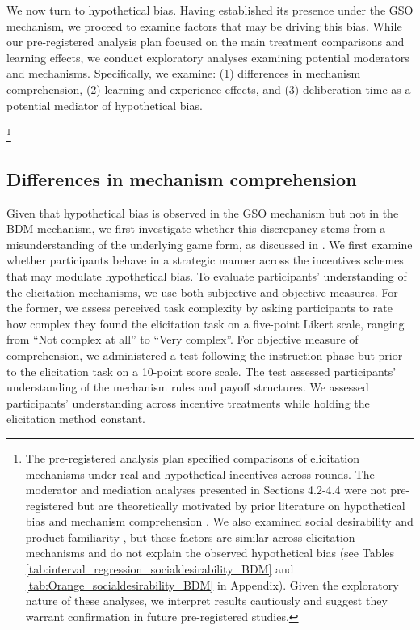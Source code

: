 \documentclass[12pt]{article}
\begin{document}
We now turn to hypothetical bias. Having established its presence under the GSO mechanism, we proceed to examine factors that may be driving this bias. While our pre-registered analysis plan focused on the main treatment comparisons and learning effects, we conduct exploratory analyses examining potential moderators and mechanisms. Specifically, we examine: (1) differences in mechanism comprehension, (2) learning and experience effects, and (3) deliberation time as a potential mediator of hypothetical bias.

\footnote{The pre-registered analysis plan specified comparisons of elicitation mechanisms under real and hypothetical incentives across rounds. The moderator and mediation analyses presented in Sections 4.2-4.4 were not pre-registered but are theoretically motivated by prior literature on hypothetical bias \citep{sims2003implications} and mechanism comprehension \citep{cason_misconceptions_2014}. We also examined social desirability \citep{norwood2011social, entem2022using, lopez2021social, bursztyn2025social} and product familiarity \citep{veettil_hypothetical_2024}, but these factors are similar across elicitation mechanisms and do not explain the observed hypothetical bias (see Tables \ref{tab:interval_regression_socialdesirability_BDM} and \ref{tab:Orange_socialdesirability_BDM} in Appendix). Given the exploratory nature of these analyses, we interpret results cautiously and suggest they warrant confirmation in future pre-registered studies.}

\subsection{Differences in mechanism comprehension}
Given that hypothetical bias is observed in the GSO mechanism but not in the BDM mechanism, we first investigate whether this discrepancy stems from a misunderstanding of the underlying game form, as discussed in \citet{cason_misconceptions_2014}. We first examine whether participants behave in a strategic manner across the incentives schemes that may modulate hypothetical bias.
To evaluate participants’ understanding of the elicitation mechanisms, we use both subjective and objective measures. For the former, we assess perceived task complexity by asking participants to rate how complex they found the elicitation task on a five-point Likert scale, ranging from “Not complex at all” to “Very complex”. 
For objective measure of comprehension, we administered a test following the instruction phase but prior to the elicitation task on a 10-point score scale. The test assessed participants’ understanding of the mechanism rules and payoff structures. 
We assessed participants' understanding across incentive treatments while holding the elicitation method constant. 
\end{document}
